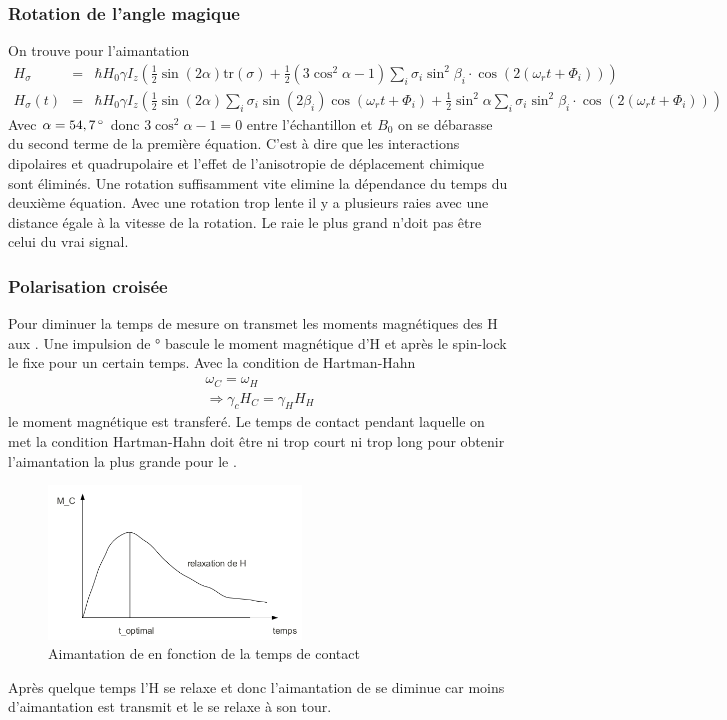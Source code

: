 \documentclass[a4paper,12pt]{scrartcl}
\begin{document}
   \subsubsection{Rotation de l'angle magique}
    On trouve pour l'aimantation
    \begin{eqnarray*}
     H_{\sigma}&=&\hbar H_0\gamma I_z\left(\frac{1}{2}\sin\left(2\alpha\right)\text{tr}\left(\sigma\right)+\frac{1}{2}\left(3\cos^2\alpha-1\right)\sum_i\sigma_i\sin^2\beta_i\cdot\cos\left(2\left(\omega_r t+\Phi_i\right)\right)\right)\\
     H_{\sigma}\left(t\right)&=&\hbar H_0\gamma I_z\left(\frac{1}{2}\sin\left(2\alpha\right)\sum_i\sigma_i\sin\left(2\beta_i\right)\cos\left(\omega_r t+\Phi_i\right)+\frac{1}{2}\sin^2\alpha \sum_i\sigma_i\sin^2\beta_i\cdot\cos\left(2\left(\omega_r t+\Phi_i\right)\right)\right)
    \end{eqnarray*}
    Avec $\alpha=\unit[54,7]{\degree}$ donc $3\cos^2\alpha-1=0$ entre l'échantillon et $B_0$ on se débarasse du second terme de la première équation. C'est à dire que les interactions dipolaires et quadrupolaire et l'effet de l'anisotropie de déplacement chimique sont éliminés. Une rotation suffisamment vite elimine la dépendance du temps du deuxième équation. Avec une rotation trop lente il y a plusieurs raies avec une distance égale à la vitesse de la rotation. Le raie le plus grand n'doit pas être celui du vrai signal. 

   \subsubsection{Polarisation croisée}
    Pour diminuer la temps de mesure on transmet les moments magnétiques des H aux . Une impulsion de \unit[90]{\degree} bascule le moment magnétique d'H et après le spin-lock le fixe pour un certain temps. Avec la condition de Hartman-Hahn
    \begin{eqnarray*}
     \omega_C=\omega_H\\
     \Rightarrow \gamma_c H_C=\gamma_H H_H
    \end{eqnarray*}
    le moment magnétique est transferé. Le temps de contact pendant laquelle on met la condition Hartman-Hahn doit être ni trop court ni trop long pour obtenir l'aimantation la plus grande pour le . 
    \begin{figure}[H]
     \includegraphics[width=0.6\textwidth]{bilder/schema_pol.png}
     \caption{Aimantation de  en fonction de la temps de contact}
    \end{figure}
    Après quelque temps l'H se relaxe et donc l'aimantation de  se diminue car moins d'aimantation est transmit et le  se relaxe à son tour.
     
\end{document}

